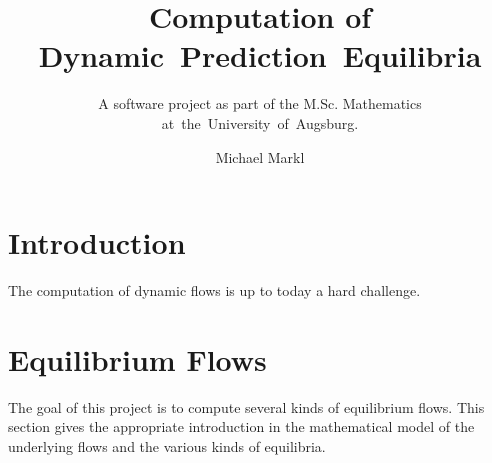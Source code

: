 \documentclass[titlepage]{scrartcl}
\author{Michael Markl}
\title{Computation of Dynamic~Prediction~Equilibria}
\subtitle{A software project as part of the M.Sc. Mathematics at~the~University~of~Augsburg.}
\theoremstyle{definition}
\begin{document}
    \maketitle

    \newpage
    \tableofcontents

    \newpage
    \section{Introduction}

    The computation of dynamic flows is up to today a hard challenge.


    \newpage
    

    \newpage
    \section{Equilibrium Flows}

    The goal of this project is to compute several kinds of equilibrium flows.
    This section gives the appropriate introduction in the mathematical model of the underlying flows and the various kinds of equilibria.
    
    
    

    \newpage
    
    
    \newpage
    

    \newpage
    \printbibliography
\end{document}
